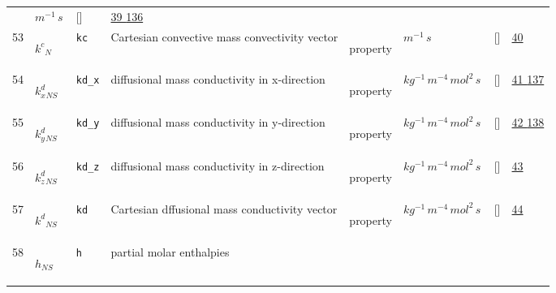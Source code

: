 \begin{longtable}{|p{1cm}|p{3cm}|p{3cm}|p{7cm}|p{3.0cm}|p{3cm}|p{2cm}|p{1cm}|}
             & $ m^{-1} \,s \, $
             & []
             & \hyperlink{"e:39"}{ 39 }
                 \hyperlink{"e:136"}{ 136 }
                 \\
    53
             & \hypertarget{"v:53"}{ $ {k^c}{_{N}} $}
             & \verb|kc|
             & Cartesian convective mass convectivity vector
             & \begin{lay}property \end{lay}
             & $ m^{-1} \,s \, $
             & []
             & \hyperlink{"e:40"}{ 40 }
                 \\
    54
             & \hypertarget{"v:54"}{ $ {k^d_x}{_{{N S}}} $}
             & \verb|kd_x|
             & diffusional mass conductivity in x-direction
             & \begin{lay}property \end{lay}
             & $ kg^{-1} \,m^{-4} \,mol^{2} \,s \, $
             & []
             & \hyperlink{"e:41"}{ 41 }
                 \hyperlink{"e:137"}{ 137 }
                 \\
    55
             & \hypertarget{"v:55"}{ $ {k^d_y}{_{{N S}}} $}
             & \verb|kd_y|
             & diffusional mass conductivity in y-direction
             & \begin{lay}property \end{lay}
             & $ kg^{-1} \,m^{-4} \,mol^{2} \,s \, $
             & []
             & \hyperlink{"e:42"}{ 42 }
                 \hyperlink{"e:138"}{ 138 }
                 \\
    56
             & \hypertarget{"v:56"}{ $ {k^d_z}{_{{N S}}} $}
             & \verb|kd_z|
             & diffusional mass conductivity in z-direction
             & \begin{lay}property \end{lay}
             & $ kg^{-1} \,m^{-4} \,mol^{2} \,s \, $
             & []
             & \hyperlink{"e:43"}{ 43 }
                 \\
    57
             & \hypertarget{"v:57"}{ $ {k^d}{_{{N S}}} $}
             & \verb|kd|
             & Cartesian dffusional mass conductivity vector
             & \begin{lay}property \end{lay}
             & $ kg^{-1} \,m^{-4} \,mol^{2} \,s \, $
             & []
             & \hyperlink{"e:44"}{ 44 }
                 \\
    58
             & \hypertarget{"v:58"}{ $ {h}{_{{N S}}} $}
             & \verb|h|
             & partial molar enthalpies

\end{longtable}
